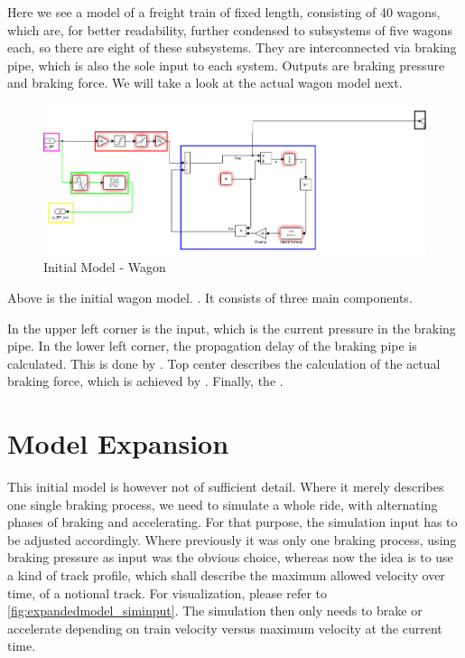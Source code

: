 \par\noindent
Here we see a model of a freight train of fixed length, consisting of 40 wagons, which are, for better readability, further condensed to subsystems of five wagons each, so there are eight of these subsystems. They are interconnected via braking pipe, which is also the sole input to each system. Outputs are braking pressure and braking force. We will take a look at the actual wagon model next.

\begin{figure}[H]
	\centering
	\includegraphics[width=\linewidth]{./pic/initmodel_wagon}
	\caption{Initial Model - Wagon}
	\label{fig:initmodel_wagon}
\end{figure}

\par\noindent
Above is the initial wagon model. . It consists of three main components.
\par
In the upper left corner is the input, which is the current pressure in the braking pipe. In the lower left corner, the propagation delay of the braking pipe is calculated. This is done by \TODO{}. Top center describes the calculation of the actual braking force, which is achieved by \TODO{}. Finally, the .

\section{Model Expansion}
\label{sec:ModelExpansion}

\par\noindent
This initial model is however not of sufficient detail. Where it merely describes one single braking process, we need to simulate a whole ride, with alternating phases of braking and accelerating. For that purpose, the simulation input has to be adjusted accordingly. Where previously it was only one braking process, using braking pressure as input was the obvious choice, whereas now the idea is to use a kind of track profile, which shall describe the maximum allowed velocity over time, of a notional track. For visualization, please refer to \ref{fig:expandedmodel_siminput}. The simulation then only needs to brake or accelerate depending on train velocity versus maximum velocity at the current time.


